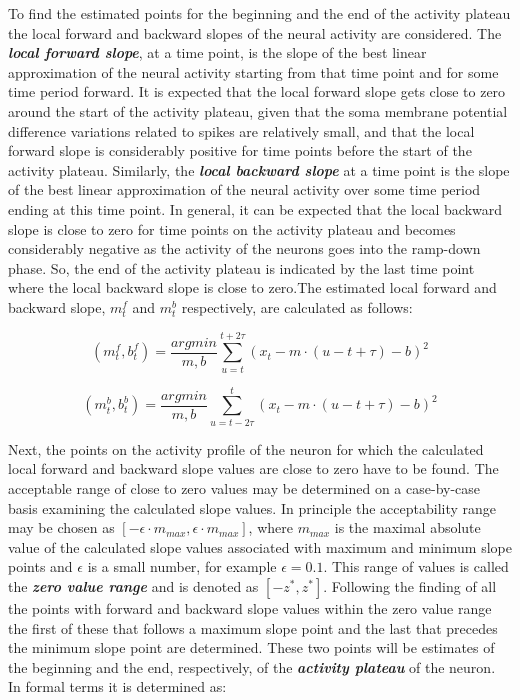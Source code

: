 To find the estimated points for the beginning and the end of the activity plateau the local forward and backward slopes of the neural activity are considered. The \textbf{\textit{local forward slope}}, at a time point, is the slope of the best linear approximation of the neural activity starting from that time point and for some time period forward. It is expected that the local forward slope gets close to zero around the start of the activity plateau, given that the soma membrane potential difference variations related to spikes are relatively small, and that the local forward slope is considerably positive for time points before the start of the activity plateau. Similarly, the \textbf{\textit{local backward slope}} at a time point is the slope of the best linear approximation of the neural activity over some time period ending at this  time point. In general, it can be expected that the local backward slope is close to zero for time points on the activity plateau and becomes considerably negative as the activity of the neurons goes into the ramp-down phase. So, the end of the activity plateau is indicated by the last time point where the local backward slope is close to zero.The estimated local forward and backward slope, $m_{t}^{f}$ and $m_{t}^{b}$ respectively, are calculated as follows:

\begin{equation}
\label{eq:forward_slope}
(m_{t}^{f},b_{t}^{f}) = \frac{argmin}{m,b}\sum_{u=t}^{t+2\tau}(x_{t}-m\cdot(u-t+\tau)-b)^{2}
\end{equation}

\begin{equation}
\label{eq:backward_slope}
(m_{t}^{b},b_{t}^{b}) = \frac{argmin}{m,b}\sum_{u=t-2\tau}^{t}(x_{t}-m\cdot(u-t+\tau)-b)^{2}
\end{equation}

Next, the points on the activity profile of the neuron for which the calculated local forward and backward slope values are close to zero have to be found. The acceptable range of close to zero values may be determined on a case-by-case basis examining the calculated slope values. In principle the acceptability range may be chosen as $[-\epsilon \cdot m_{max},\epsilon \cdot m_{max}]$, where $m_{max}$ is the maximal absolute value of the calculated slope values associated with maximum and minimum slope points and $\epsilon$ is a small number, for example $\epsilon=0.1$. This range of values is called the \textbf{\textit{zero value range}} and is denoted as $[-z^{*},z^{*}]$. Following the finding of all the points with forward and backward slope values within the zero value range the first of these that follows a maximum slope point and the last that precedes the minimum slope point are determined. These two points will be estimates of the beginning and the end, respectively, of the \textbf{\textit{activity plateau}} of the neuron. In formal terms it is determined as:

